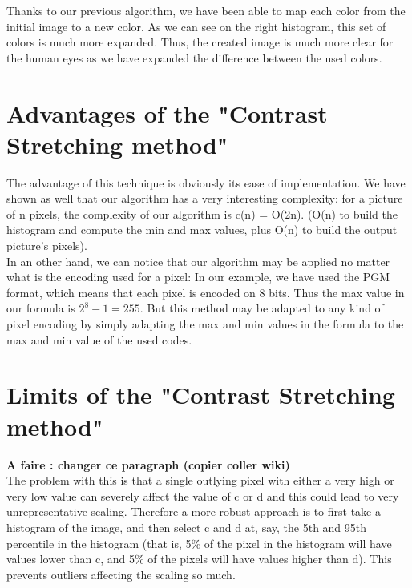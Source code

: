 \documentclass[a4paper]{article}
\begin{document}
    Thanks to our previous algorithm, we have been able to map each color from the initial image to a new color.  As we can see on the right histogram, this set of colors is much more expanded.   Thus, the created image is much more clear for the human eyes as we have expanded the difference between the used colors.

\section{Advantages of the "Contrast Stretching method" }
	The advantage of this technique is obviously its ease of implementation.   We have shown as well that our algorithm has a very interesting complexity: for a picture of n pixels, the complexity of our algorithm is c(n) = O(2n).  (O(n) to build the histogram and compute the min and max values, plus O(n) to build the output picture's pixels).\\

In an other hand, we can notice that our algorithm may be applied no matter what is the encoding used for a pixel:  In our example, we have used the PGM format, which means that each pixel is encoded on 8 bits.   Thus the max value in our formula is $2^{8} -1 = 255$.  But this method may be adapted to any kind of pixel encoding by simply adapting the max and min values in the formula to the max and min value of the used codes.


\section{Limits of the "Contrast Stretching method" }
\textbf{A faire : changer ce paragraph (copier coller wiki)}\\
The problem with this is that a single outlying pixel with either a very high or very low value can severely affect the value of c or d and this could lead to very unrepresentative scaling. Therefore a more robust approach is to first take a histogram of the image, and then select c and d at, say, the 5th and 95th percentile in the histogram (that is, 5\% of the pixel in the histogram will have values lower than c, and 5\% of the pixels will have values higher than d). This prevents outliers affecting the scaling so much. 
\end{document}
